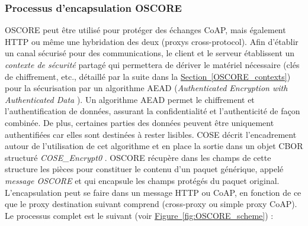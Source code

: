 \documentclass[]{report}
\newcommand{\wordlink}[2]{\hyperref[#2]{#1~\ref{#2}}}
\begin{document}
\newpage

\subsubsection{Processus d'encapsulation OSCORE}

\par OSCORE peut être utilisé pour protéger des échanges CoAP, mais également HTTP ou même une hybridation des deux (proxys cross-protocol). Afin d'établir un canal sécurisé pour des communications, le client et le serveur établissent un \textit{contexte de sécurité} partagé qui permettera de dériver le matériel nécessaire (clés de chiffrement, etc., détaillé par la suite dans la \wordlink{Section}{OSCORE_contexts}) pour la sécurisation par un algorithme AEAD (\textit{Authenticated Encryption with Authenticated Data} \cite{rfc5116}). Un algorithme AEAD permet le chiffrement et l'authentification de données, assurant la confidentialité et l'authenticité de façon combinée. De plus, certaines parties des données peuvent être uniquement authentifiées car elles sont destinées à rester lisibles. COSE décrit l'encadrement autour de l'utilisation de cet algorithme et en place la sortie dans un objet CBOR structuré \textit{COSE\_Encrypt0}  \cite{rfc8152}. OSCORE récupère dans les champs de cette structure les pièces pour constituer le contenu d'un paquet générique, appelé \textit{message OSCORE} et qui encapsule les champs protégés du paquet original. L'encapsulation peut se faire dans un message HTTP ou CoAP, en fonction de ce que le proxy destination suivant comprend (cross-proxy ou simple proxy CoAP). Le processus complet est le suivant (voir \wordlink{Figure}{fig:OSCORE_scheme}) :
\end{document}
